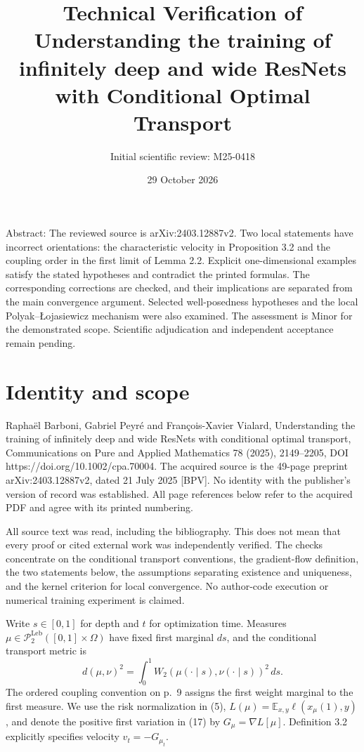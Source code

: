 \documentclass[10pt]{article}
\title{Technical Verification of
Understanding the training of infinitely deep and wide ResNets with Conditional Optimal Transport}
\author{Initial scientific review: M25-0418}
\date{29 October 2026}
\begin{document}
\maketitle
Abstract: The reviewed source is arXiv:2403.12887v2. Two local statements have incorrect orientations: the characteristic velocity in Proposition 3.2 and the coupling order in the first limit of Lemma 2.2. Explicit one-dimensional examples satisfy the stated hypotheses and contradict the printed formulas. The corresponding corrections are checked, and their implications are separated from the main convergence argument. Selected well-posedness hypotheses and the local Polyak–Łojasiewicz mechanism were also examined. The assessment is Minor for the demonstrated scope. Scientific adjudication and independent acceptance remain pending.\par
\section*{Identity and scope}
Raphaël Barboni, Gabriel Peyré and François-Xavier Vialard, Understanding the training of infinitely deep and wide ResNets with conditional optimal transport, Communications on Pure and Applied Mathematics 78 (2025), 2149–2205, DOI https://doi.org/10.1002/cpa.70004. The acquired source is the 49-page preprint arXiv:2403.12887v2, dated 21 July 2025 [BPV]. No identity with the publisher’s version of record was established. All page references below refer to the acquired PDF and agree with its printed numbering.\par
All source text was read, including the bibliography. This does not mean that every proof or cited external work was independently verified. The checks concentrate on the conditional transport conventions, the gradient-flow definition, the two statements below, the assumptions separating existence and uniqueness, and the kernel criterion for local convergence. No author-code execution or numerical training experiment is claimed.\par
Write \(s\in[0,1]\) for depth and \(t\) for optimization time. Measures \(\mu\in\mathcal P^{\mathrm{Leb}}_2([0,1]\times\Omega)\) have fixed first marginal \(ds\), and the conditional transport metric is \[d(\mu,\nu)^2=\int_0^1 W_2(\mu(\cdot\mid s),\nu(\cdot\mid s))^2\,ds.\] The ordered coupling convention on p. 9 assigns the first weight marginal to the first measure. We use the risk normalization in (5), \(L(\mu)=\mathbb E_{x,y}\ell(x_\mu(1),y)\), and denote the positive first variation in (17) by \(G_\mu=\nabla L[\mu]\). Definition 3.2 explicitly specifies velocity \(v_t=-G_{\mu_t}\).\par
\end{document}
